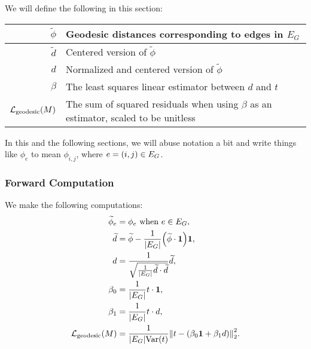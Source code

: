 We will define the following in this section: \begin{center}\begin{tabular}{r|l}
	\(\widetilde{\phi}\) & Geodesic distances corresponding to edges in \(E_G\) \\ \hline
	\(\widetilde{d}\) & Centered version of \(\widetilde{\phi}\) \\ \hline
	\(d\) & Normalized and centered version of \(\widetilde{\phi}\) \\ \hline
	\(\beta\) & The least squares linear estimator between \(d\) and \(t\) \\ \hline
	\(\mathcal{L}_{\mathrm{geodesic}}\pof{M}\) & The sum of squared residuals when using \(\beta\) as an estimator, scaled to be unitless
\end{tabular}\end{center} In this and the following sections, we will abuse notation a bit and write things like \(\phi_e\) to mean \(\phi_{i, j}\), where \(e = \pof{i, j} \in E_G\).

\subsubsection{Forward Computation}
We make the following computations: \begin{align*}
	\widetilde{\phi}_e &= \phi_e \text{ when \(e \in E_G\)}, \\
	\widetilde{d} &= \widetilde{\phi} - \frac{1}{\abs{E_G}}\pof{\widetilde{\phi} \cdot \mathbf{1}}\mathbf{1}, \\
	d &= \frac{1}{\sqrt{\frac{1}{\abs{E_G}}\widetilde{d} \cdot \widetilde{d}}}\widetilde{d}, \\
	\beta_0 &= \frac{1}{\abs{E_G}}t \cdot \mathbf{1}, \\
	\beta_1 &= \frac{1}{\abs{E_G}}t \cdot d, \\
	\mathcal{L}_{\mathrm{geodesic}}\pof{M} &= \frac{1}{\abs{E_G}\Var\pof{t}}\norm{t - \pof{\beta_0\mathbf{1} + \beta_1d}}_2^2. \\
\end{align*}

